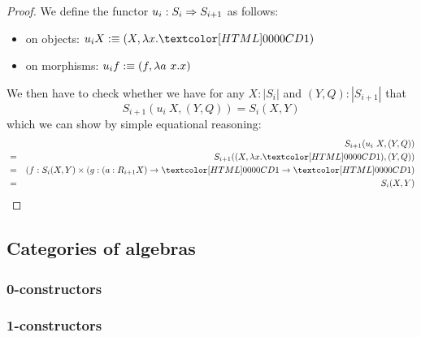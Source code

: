 \begin{proof}
  We define the functor $u_i : S_i \Rightarrow S_{i+1}$ as follows:
  \begin{itemize}
  \item on objects: $u_i X \ddefeq (X , \lambda x . \unitty)$
  \item on morphisms: $u_i f :\equiv (f , \lambda a\ x . x)$
  \end{itemize}
  We then have to check whether we have for any $X : | S_i |$ and
  $(Y,Q) : | S_{i+1} |$ that
  $$
  S_{i+1}(u_i\ X , (Y,Q)) = S_i(X,Y)
  $$
  which we can show by simple equational reasoning:
  \begin{align*}
      &&S_{i+1}(u_i\ X , (Y,Q)) \\
    &=& S_{i+1}((X,\lambda x . \unitty), (Y,Q)) \\
    &=& (f : S_i(X,Y) \times (g : (a : R_{i+1} X) \to \unitty \to \unitty) \\
    &=& S_i(X,Y)
  \end{align*}

\end{proof}

\subsection{Categories of algebras}

\subsubsection{0-constructors}

\subsubsection{1-constructors}
